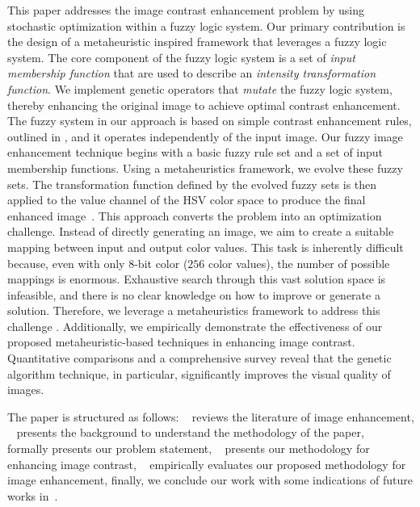 This paper addresses the image contrast enhancement problem by using stochastic optimization within a fuzzy logic system. 
Our primary contribution is the design of a metaheuristic inspired framework that leverages a fuzzy logic system.
The core component of the fuzzy logic system is a set of {\em input membership function} that are used to describe an {\em intensity transformation function}. 
We implement genetic operators that {\em mutate} the fuzzy logic system, thereby enhancing the original image to achieve optimal contrast enhancement. 
The fuzzy system in our approach is based on simple contrast enhancement rules, outlined in \cite{gonzalez2008digital}, and it operates independently of the input image.
Our fuzzy image enhancement technique begins with a basic fuzzy rule set and a set of input membership functions. 
Using a metaheuristics framework, we evolve these fuzzy sets. 
The transformation function defined by the evolved fuzzy sets is then applied to the value channel of the HSV color space to produce the final enhanced image~\cite{schiller2018evaluation}. 
This approach converts the problem into an optimization challenge. 
Instead of directly generating an image, we aim to create a suitable mapping between input and output color values. 
This task is inherently difficult because, even with only $8$-bit color ($256$ color values), the number of possible mappings is enormous. 
Exhaustive search through this vast solution space is infeasible, and there is no clear knowledge on how to improve or generate a solution. 
Therefore, we leverage a metaheuristics framework to address this challenge \cite{Luke2009Metaheuristics}.
Additionally, we empirically demonstrate the effectiveness of our proposed metaheuristic-based techniques in enhancing image contrast. Quantitative comparisons and a comprehensive survey reveal that the genetic algorithm technique, in particular, significantly improves the visual quality of images.

The paper is structured as follows:
~ reviews the literature of image enhancement,
~ presents the background to understand the methodology of the paper, 
~ formally presents our problem statement, 
~ presents our methodology for enhancing image contrast, 
~ empirically evaluates our proposed methodology for image enhancement, 
finally, we conclude our work with some indications of future works in~.

